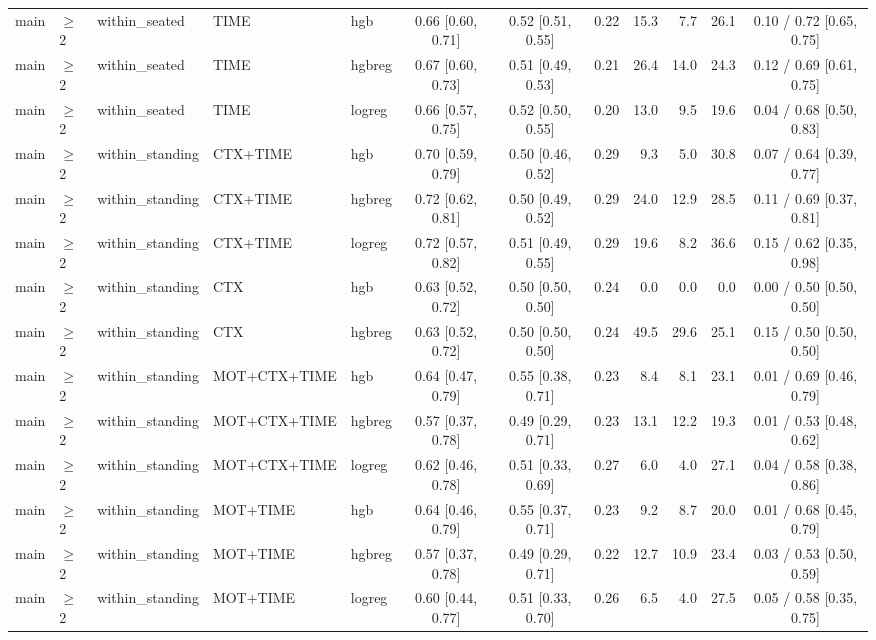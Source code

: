 \begin{longtable}{@{}lllllcccrrrc@{}}
main & $\geq$2 & within\_seated & TIME & hgb & 0.66 [0.60, 0.71] & 0.52 [0.51, 0.55] & 0.22 & 15.3 & 7.7 & 26.1 & 0.10 / 0.72 [0.65, 0.75] \\
main & $\geq$2 & within\_seated & TIME & hgbreg & 0.67 [0.60, 0.73] & 0.51 [0.49, 0.53] & 0.21 & 26.4 & 14.0 & 24.3 & 0.12 / 0.69 [0.61, 0.75] \\
main & $\geq$2 & within\_seated & TIME & logreg & 0.66 [0.57, 0.75] & 0.52 [0.50, 0.55] & 0.20 & 13.0 & 9.5 & 19.6 & 0.04 / 0.68 [0.50, 0.83] \\
main & $\geq$2 & within\_standing & CTX+TIME & hgb & 0.70 [0.59, 0.79] & 0.50 [0.46, 0.52] & 0.29 & 9.3 & 5.0 & 30.8 & 0.07 / 0.64 [0.39, 0.77] \\
main & $\geq$2 & within\_standing & CTX+TIME & hgbreg & 0.72 [0.62, 0.81] & 0.50 [0.49, 0.52] & 0.29 & 24.0 & 12.9 & 28.5 & 0.11 / 0.69 [0.37, 0.81] \\
main & $\geq$2 & within\_standing & CTX+TIME & logreg & 0.72 [0.57, 0.82] & 0.51 [0.49, 0.55] & 0.29 & 19.6 & 8.2 & 36.6 & 0.15 / 0.62 [0.35, 0.98] \\
main & $\geq$2 & within\_standing & CTX & hgb & 0.63 [0.52, 0.72] & 0.50 [0.50, 0.50] & 0.24 & 0.0 & 0.0 & 0.0 & 0.00 / 0.50 [0.50, 0.50] \\
main & $\geq$2 & within\_standing & CTX & hgbreg & 0.63 [0.52, 0.72] & 0.50 [0.50, 0.50] & 0.24 & 49.5 & 29.6 & 25.1 & 0.15 / 0.50 [0.50, 0.50] \\
main & $\geq$2 & within\_standing & MOT+CTX+TIME & hgb & 0.64 [0.47, 0.79] & 0.55 [0.38, 0.71] & 0.23 & 8.4 & 8.1 & 23.1 & 0.01 / 0.69 [0.46, 0.79] \\
main & $\geq$2 & within\_standing & MOT+CTX+TIME & hgbreg & 0.57 [0.37, 0.78] & 0.49 [0.29, 0.71] & 0.23 & 13.1 & 12.2 & 19.3 & 0.01 / 0.53 [0.48, 0.62] \\
main & $\geq$2 & within\_standing & MOT+CTX+TIME & logreg & 0.62 [0.46, 0.78] & 0.51 [0.33, 0.69] & 0.27 & 6.0 & 4.0 & 27.1 & 0.04 / 0.58 [0.38, 0.86] \\
main & $\geq$2 & within\_standing & MOT+TIME & hgb & 0.64 [0.46, 0.79] & 0.55 [0.37, 0.71] & 0.23 & 9.2 & 8.7 & 20.0 & 0.01 / 0.68 [0.45, 0.79] \\
main & $\geq$2 & within\_standing & MOT+TIME & hgbreg & 0.57 [0.37, 0.78] & 0.49 [0.29, 0.71] & 0.22 & 12.7 & 10.9 & 23.4 & 0.03 / 0.53 [0.50, 0.59] \\
main & $\geq$2 & within\_standing & MOT+TIME & logreg & 0.60 [0.44, 0.77] & 0.51 [0.33, 0.70] & 0.26 & 6.5 & 4.0 & 27.5 & 0.05 / 0.58 [0.35, 0.75] \\

\end{longtable}
